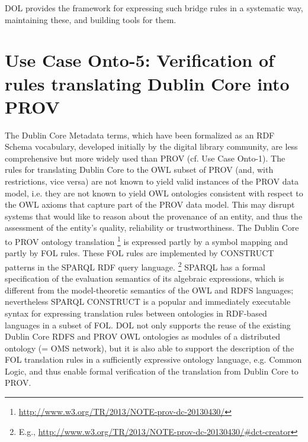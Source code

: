 \documentclass[10pt,fleqn,%
\ifpretendfinal
final%
\else
draft%
\fi,
]{scrreprt}
\begin{document}
DOL  provides the framework for expressing such bridge rules in a systematic way, maintaining these, and building tools for them. 

\section{Use Case Onto-5: Verification of rules translating Dublin Core into PROV}
The Dublin Core Metadata terms, which have been formalized as an RDF Schema vocabulary, developed initially by the digital library community, are less 
comprehensive but more widely used than PROV (cf. Use Case Onto-1). The rules for translating Dublin Core to the OWL subset of PROV (and, with restrictions, 
vice versa) are not known to yield valid instances of the PROV data model, i.e. they are not known to yield OWL ontologies consistent with respect to the OWL axioms that 
capture part of the PROV data model. This may disrupt systems that would like to reason about the provenance of an entity, and thus the assessment of the 
entity's quality, reliability or trustworthiness.
The Dublin Core to PROV ontology translation%
\footnote{\url{http://www.w3.org/TR/2013/NOTE-prov-dc-20130430/}}
  is expressed partly by a symbol mapping and partly by FOL rules. These FOL rules are implemented by CONSTRUCT patterns in the SPARQL RDF query language.%
\footnote{E.g., \url{http://www.w3.org/TR/2013/NOTE-prov-dc-20130430/\#dct-creator}} 
SPARQL has a formal specification of the evaluation semantics of its algebraic expressions, which is different from the model-theoretic semantics of the OWL and RDFS languages; nevertheless SPARQL CONSTRUCT is a popular and immediately executable syntax for expressing translation rules between ontologies in RDF-based languages in a subset of FOL.
DOL  not only supports the reuse of the existing Dublin Core RDFS and PROV OWL ontologies as modules of a distributed ontology (= OMS network), but it is also able to support the description of the FOL translation rules in a sufficiently expressive ontology language, e.g. Common Logic, and thus enable formal verification of the translation from Dublin Core to PROV.
\end{document}
